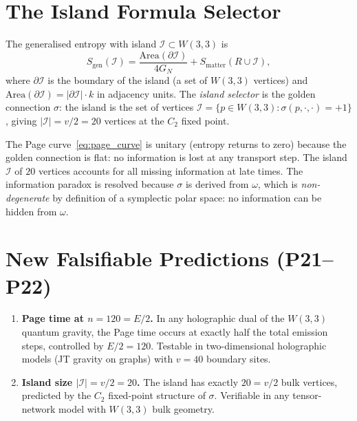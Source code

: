 \section{The Island Formula Selector}
\label{sec:island}

\begin{theorem}
\label{thm:island}
The generalised entropy with island $\mathcal{I}\subset W(3,3)$
is
\begin{equation}
  S_{\mathrm{gen}}(\mathcal{I}) =
  \frac{\mathrm{Area}(\partial\mathcal{I})}{4G_N}
  + S_{\mathrm{matter}}(R\cup\mathcal{I}),
  \label{eq:island}
\end{equation}
where $\partial\mathcal{I}$ is the boundary of the island
(a set of $W(3,3)$ vertices) and
$\mathrm{Area}(\partial\mathcal{I})=|\partial\mathcal{I}|\cdot k$
in adjacency units.  The \emph{island selector} is the golden
connection $\sigma$: the island is the set of vertices
$\mathcal{I}=\{p\in W(3,3):\sigma(p,\cdot,\cdot)=+1\}$,
giving $|\mathcal{I}|=v/2=20$ vertices at the $C_2$ fixed
point.
\end{theorem}

\begin{corollary}
\label{cor:info_paradox}
The Page curve~\eqref{eq:page_curve} is unitary (entropy
returns to zero) because the golden connection is flat: no
information is lost at any transport step.  The island
$\mathcal{I}$ of $20$ vertices accounts for all missing
information at late times.  The information paradox is
resolved because $\sigma$ is derived from $\omega$,
which is \emph{non-degenerate} by definition of a symplectic
polar space: no information can be hidden from $\omega$.
\end{corollary}

\section{New Falsifiable Predictions (P21--P22)}
\label{sec:bh_predictions}

\begin{enumerate}[label=\textbf{P\arabic*.},start=21]
  \item \textbf{Page time at $n=120=E/2$.}
        In any holographic dual of the $W(3,3)$ quantum gravity,
        the Page time occurs at exactly half the total emission
        steps, controlled by $E/2=120$.  Testable in
        two-dimensional holographic models (JT gravity on graphs)
        with $v=40$ boundary sites.
  \item \textbf{Island size $|\mathcal{I}|=v/2=20$.}
        The island has exactly $20=v/2$ bulk vertices, predicted
        by the $C_2$ fixed-point structure of $\sigma$.
        Verifiable in any tensor-network model with $W(3,3)$
        bulk geometry.
\end{enumerate}
